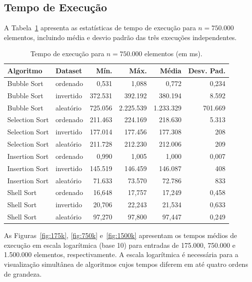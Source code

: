 \documentclass[12pt]{article}
\begin{document}
\subsection{Tempo de Execução}

A Tabela~\ref{tab:tempo} apresenta as estatísticas de tempo
de execução para $n = 750.000$ elementos, incluindo média e
desvio padrão das três execuções independentes.

\begin{table}[ht]
\centering
\caption{Tempo de execução para $n = 750.000$ elementos (em ms).}
\label{tab:tempo}
\begin{tabular}{llrrrr}
\toprule
\textbf{Algoritmo} & \textbf{Dataset} &
\textbf{Mín.} & \textbf{Máx.} &
\textbf{Média} & \textbf{Desv. Pad.} \\
\midrule
Bubble Sort    & ordenado  & 0,531      & 1,088      & 0,772        & 0,234       \\
Bubble Sort    & invertido & 372.531   & 392.192   & 380.194     & 8.592       \\
Bubble Sort    & aleatório & 725.056   & 2.225.539 & 1.233.329   & 701.669     \\
\midrule
Selection Sort & ordenado  & 211.463   & 224.169   & 218.630     & 5.313       \\
Selection Sort & invertido & 177.014   & 177.456   & 177.308     & 208         \\
Selection Sort & aleatório & 211.728   & 212.230   & 212.006     & 209         \\
\midrule
Insertion Sort & ordenado  & 0,990      & 1,005      & 1,000        & 0,007       \\
Insertion Sort & invertido & 145.519   & 146.459   & 146.087     & 408         \\
Insertion Sort & aleatório & 71.633    & 73.570    & 72.786      & 833         \\
\midrule
Shell Sort     & ordenado  & 16,648    & 17,757    & 17,249      & 0,458       \\
Shell Sort     & invertido & 20,706    & 22,243    & 21,534      & 0,633       \\
Shell Sort     & aleatório & 97,270    & 97,800    & 97,447      & 0,249       \\
\bottomrule
\end{tabular}
\end{table}

As Figuras~\ref{fig:175k}, \ref{fig:750k} e~\ref{fig:1500k} apresentam os
tempos médios de execução em escala logarítmica (base 10)
para entradas de 175.000, 750.000 e 1.500.000 elementos, respectivamente.
A escala logarítmica é necessária para a visualização simultânea
de algoritmos cujos tempos diferem em até quatro ordens de
grandeza.
\end{document}
